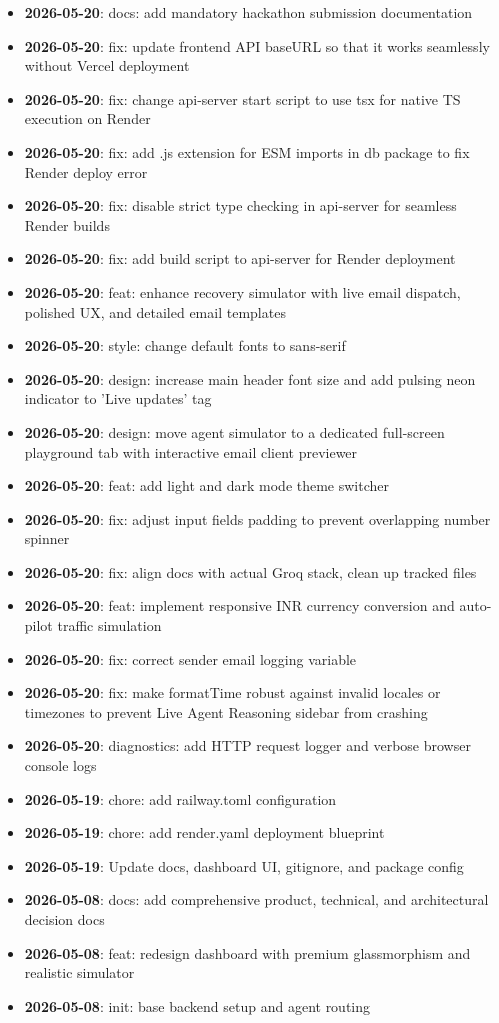\documentclass[11pt, a4paper]{article}
\begin{document}
\begin{itemize}
    \item \textbf{2026-05-20}: docs: add mandatory hackathon submission documentation
    \item \textbf{2026-05-20}: fix: update frontend API baseURL so that it works seamlessly without Vercel deployment
    \item \textbf{2026-05-20}: fix: change api-server start script to use tsx for native TS execution on Render
    \item \textbf{2026-05-20}: fix: add .js extension for ESM imports in db package to fix Render deploy error
    \item \textbf{2026-05-20}: fix: disable strict type checking in api-server for seamless Render builds
    \item \textbf{2026-05-20}: fix: add build script to api-server for Render deployment
    \item \textbf{2026-05-20}: feat: enhance recovery simulator with live email dispatch, polished UX, and detailed email templates
    \item \textbf{2026-05-20}: style: change default fonts to sans-serif
    \item \textbf{2026-05-20}: design: increase main header font size and add pulsing neon indicator to 'Live updates' tag
    \item \textbf{2026-05-20}: design: move agent simulator to a dedicated full-screen playground tab with interactive email client previewer
    \item \textbf{2026-05-20}: feat: add light and dark mode theme switcher
    \item \textbf{2026-05-20}: fix: adjust input fields padding to prevent overlapping number spinner
    \item \textbf{2026-05-20}: fix: align docs with actual Groq stack, clean up tracked files
    \item \textbf{2026-05-20}: feat: implement responsive INR currency conversion and auto-pilot traffic simulation
    \item \textbf{2026-05-20}: fix: correct sender email logging variable
    \item \textbf{2026-05-20}: fix: make formatTime robust against invalid locales or timezones to prevent Live Agent Reasoning sidebar from crashing
    \item \textbf{2026-05-20}: diagnostics: add HTTP request logger and verbose browser console logs
    \item \textbf{2026-05-19}: chore: add railway.toml configuration
    \item \textbf{2026-05-19}: chore: add render.yaml deployment blueprint
    \item \textbf{2026-05-19}: Update docs, dashboard UI, gitignore, and package config
    \item \textbf{2026-05-08}: docs: add comprehensive product, technical, and architectural decision docs
    \item \textbf{2026-05-08}: feat: redesign dashboard with premium glassmorphism and realistic simulator
    \item \textbf{2026-05-08}: init: base backend setup and agent routing
\end{itemize}
\end{document}
